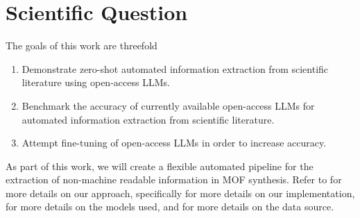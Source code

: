 \section{Scientific Question}\label{sec:question}

The goals of this work are threefold
\begin{enumerate}
    \item Demonstrate zero-shot automated information extraction from scientific literature using open-access \glspl{LLM}.
    \item Benchmark the accuracy of currently available open-access \glspl{LLM} for automated information extraction from scientific literature.
    \item Attempt fine-tuning of open-access \glspl{LLM} in order to increase accuracy.
\end{enumerate}

As part of this work, we will create a flexible automated pipeline for the extraction of non-machine readable information in \gls{MOF} synthesis.
Refer to  for more details on our approach, specifically  for more details on our implementation,  for more details on the models used, and  for more details on the data source.
